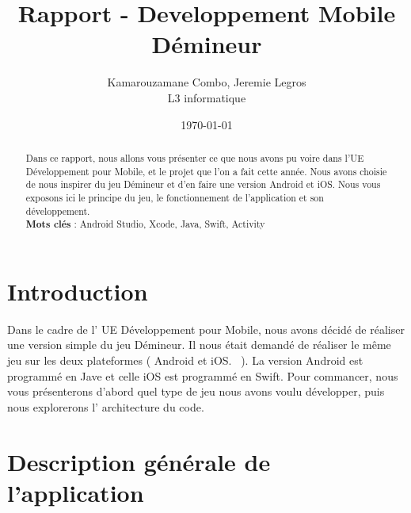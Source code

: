 \documentclass{article}
\title{\textbf{ Rapport - Developpement Mobile \\ Démineur}}
\author{Kamarouzamane Combo, Jeremie Legros\\
		L3 informatique\\
	  }
\date{\today}
\begin{document}
\maketitle %


\begin{abstract}
	Dans ce rapport, nous allons vous présenter ce que nous avons pu voire dans l'UE Développement pour Mobile, et le projet que l'on a fait cette année.  Nous avons choisie de nous inspirer du jeu Démineur et d'en faire une version Android et iOS. Nous vous exposons ici le principe du jeu, le fonctionnement de l'application et son développement.\\

	\textbf{Mots clés }: Android Studio, Xcode, Java, Swift, Activity
\end{abstract}


\section{Introduction}
\label{section:intro} %
	Dans le cadre de l' UE Développement pour Mobile, nous avons décidé de réaliser une version simple du jeu Démineur.
Il nous était demandé de réaliser le même jeu sur les deux plateformes ( Android et iOS.~\cite{statOS} ). 
La version Android est programmé en Jave et celle iOS est programmé en Swift. Pour commancer, nous vous présenterons d'abord quel type de jeu nous avons voulu développer, puis nous explorerons l' architecture du code.


\section{Description générale de l'application}
\end{document}
